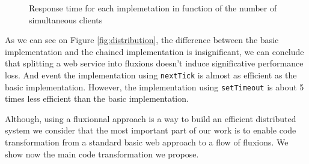 % 

% 

% 

\begin{figure}

\caption{Response time for each implemetation in function of the number of simultaneous clients}
\label{fig:timecountsetTimeout}
\end{figure}

As we can see on Figure \ref{fig:distribution}, the difference between the basic implementation and the chained implementation is insignificant, we can conclude that splitting a web service into fluxions doesn't induce significative performance loss.
And event the implementation using \texttt{nextTick} is almost as efficient as the basic implementation.
However, the implementation using \texttt{setTimeout} is about 5 times less efficient than the basic implementation.

% 

% 




\TODO{}
Although, using a fluxionnal approach is a way to build an efficient distributed system we consider that the most important part of our work is to enable code transformation from a standard basic web approach to a flow of fluxions.
We show now the main code transformation we propose.